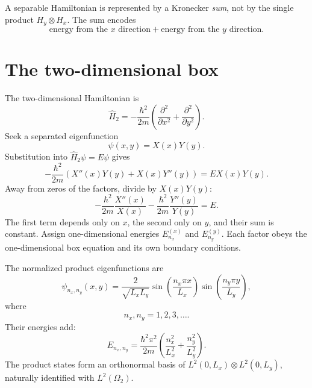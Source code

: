 A separable Hamiltonian is represented by a Kronecker \emph{sum}, not by the
single product \(H_y\otimes H_x\). The sum encodes
\begin{equation}
  \text{energy from the }x\text{ direction}
  +
  \text{energy from the }y\text{ direction}.
\end{equation}

\section{The two-dimensional box}

The two-dimensional Hamiltonian is
\begin{equation}
  \hat H_2
  =-\frac{\hbar^2}{2m}
   \left(
     \frac{\partial^2}{\partial x^2}
     +\frac{\partial^2}{\partial y^2}
   \right).
\end{equation}
Seek a separated eigenfunction
\begin{equation}
  \psi(x,y)=X(x)Y(y).
\end{equation}
Substitution into \(\hat H_2\psi=E\psi\) gives
\begin{equation}
  -\frac{\hbar^2}{2m}
  \left(X''(x)Y(y)+X(x)Y''(y)\right)
  =EX(x)Y(y).
\end{equation}
Away from zeros of the factors, divide by \(X(x)Y(y)\):
\begin{equation}
  -\frac{\hbar^2}{2m}\frac{X''(x)}{X(x)}
  -\frac{\hbar^2}{2m}\frac{Y''(y)}{Y(y)}
  =E.
\end{equation}
The first term depends only on \(x\), the second only on \(y\), and their sum
is constant. Assign one-dimensional energies \(E_{n_x}^{(x)}\) and
\(E_{n_y}^{(y)}\). Each factor obeys the one-dimensional box equation and its
own boundary conditions.

The normalized product eigenfunctions are
\begin{equation}
  \psi_{n_x,n_y}(x,y)
  =\frac{2}{\sqrt{L_xL_y}}
   \sin\!\left(\frac{n_x\pi x}{L_x}\right)
   \sin\!\left(\frac{n_y\pi y}{L_y}\right),
\end{equation}
where
\begin{equation}
  n_x,n_y=1,2,3,\ldots.
\end{equation}
Their energies add:
\begin{equation}
  E_{n_x,n_y}
  =\frac{\hbar^2\pi^2}{2m}
   \left(
     \frac{n_x^2}{L_x^2}
     +\frac{n_y^2}{L_y^2}
   \right).
\end{equation}
The product states form an orthonormal basis of
\(L^2(0,L_x)\otimes L^2(0,L_y)\), naturally identified with
\(L^2(\Omega_2)\).

